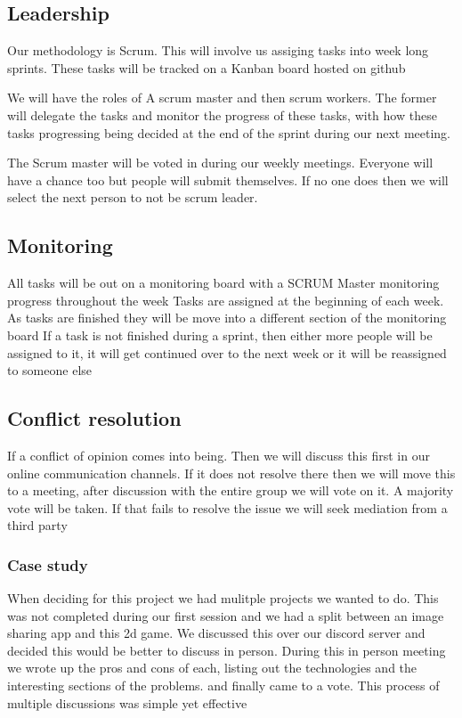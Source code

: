 \documentclass{article}
\begin{document}
\subsection{Leadership}%
\label{subsec:leadership}
Our methodology is Scrum. This will involve us assiging tasks into week long
sprints. These tasks will be tracked on a Kanban board hosted on github

We will have the roles of A scrum master and then scrum workers. The former will
delegate the tasks and monitor the progress of these tasks, with how these tasks
progressing being decided at the end of the sprint during our next meeting.

The Scrum master will be voted in during our weekly meetings. Everyone will have
a chance too but people will submit themselves. If no one does then we will
select the next person to not be scrum leader.

\subsection{Monitoring}%
\label{subsec:mon}
All tasks will be out on a monitoring board with a SCRUM Master monitoring progress throughout the week
Tasks are assigned at the beginning of each week.
As tasks are finished they will be move into a different section of the monitoring board
If a task is not finished during a sprint, then either more people will be assigned to it, it will get continued over to the next week or it will be reassigned to someone else

\subsection{Conflict resolution}%
\label{subsec:cres}

If a conflict of opinion comes into being. Then we will discuss this first in
our online communication channels.
If it does not resolve there then we will move this to a meeting, after
discussion with the entire group we will vote on it. A majority vote will be
taken.
If that fails to resolve the issue we will seek mediation from a third party

\subsubsection{Case study}
When deciding for this project we had mulitple projects we wanted to do.
This was not completed during our first session and we had a split between an
image sharing app and this 2d game.
We discussed this over our discord server and decided this would be better to
discuss in person.
During this in person meeting we wrote up the pros and cons of each, listing out
the technologies and the interesting sections of the problems. and finally came
to a vote. This process of multiple discussions was simple yet effective
\end{document}
